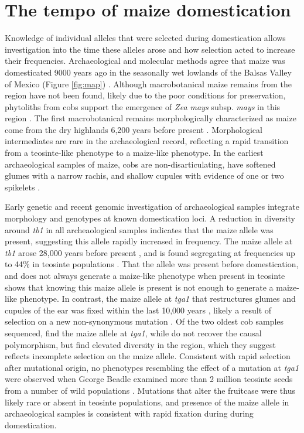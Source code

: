 \documentclass[9pt,twocolumn,twoside]{rilabRxiv}
\begin{document}
 \section*{The tempo of maize domestication}

Knowledge of individual alleles that were selected during domestication allows investigation into the time these alleles arose and how selection acted to increase their frequencies.
Archaeological and molecular methods agree that maize was domesticated 9000 years ago in the seasonally wet lowlands of the Balsas Valley of Mexico (Figure \ref{fig:map})  \citep{matsuoka2002, piperno2009, ranere2009}.
Although macrobotanical maize remains from the region have not been found, likely due to the poor conditions for preservation, phytoliths from cobs support the emergence of \textit{Zea mays} subsp. \textit{mays} in this region \citep{piperno2009}.
The first macrobotanical remains morphologically characterized as maize come from the dry highlands 6,200 years before present \citep{mangelsdorf1967, benz2001, piperno2001}.
Morphological intermediates are rare in the archaeological record, reflecting a rapid transition from a teosinte-like phenotype to a maize-like phenotype.
In the earliest archaeological samples of maize, cobs are non-disarticulating, have softened glumes with a narrow rachis, and shallow cupules with evidence of one or two spikelets \citep{mangelsdorf1974, benz2001,  kennett2017}.

Early genetic \citep{jaenickedespres2003} and recent genomic  \citep{fonseca2015,  ramosmadrigal2016, vallebueno2016, swarts2017} investigation of archaeological samples integrate morphology and genotypes at known domestication loci.
A reduction in diversity around \textit{tb1} in all archeaological samples indicates that the maize allele was present, suggesting this allele rapidly increased in frequency.
The maize allele at \textit{tb1} arose 28,000 years before present \citep{studer2011}, and is found segregating at frequencies up to 44\% in teosinte populations \citep{studer2011, vann2015}.
That the allele was present before domestication, and does not always generate a maize-like phenotype when present in teosinte \citep{vann2015} shows that knowing this maize allele is present is not enough to generate a maize-like phenotype.
In contrast, the maize allele at \textit{tga1} that restructures glumes and cupules of the ear was fixed within the last 10,000 years \citep{wang2005}, likely a result of selection on a new non-synonymous mutation \citep{wang2015}.
Of the two oldest cob samples sequenced, \citet{ramosmadrigal2016} find the maize allele at \textit{tga1}, while \citet{vallebueno2016} do not recover the causal polymorphism, but find elevated diversity in the region, which they suggest reflects incomplete selection on the maize allele.
Consistent with rapid selection after mutational origin, no phenotypes resembling the effect of a mutation at \textit{tga1} were observed when George Beadle examined more than 2 million teosinte seeds from a number of wild populations  \citep{beadle1980, bergsingerbook}.
Mutations that alter the fruitcase were thus likely rare or absent in teosinte populations, and presence of the maize allele in archaeological samples is consistent with rapid fixation during during domestication.
\end{document}
